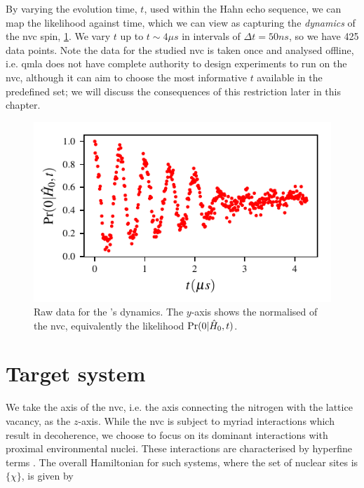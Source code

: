 By varying the evolution time, $t$, used within the Hahn echo sequence, we can map the \gls{likelihood} against time, 
    which we can view as capturing the \emph{dynamics} of the \gls{nvc} spin, \cref{fig:nv_raw_data}.
We vary $t$ up to $t \sim 4 \mu s$ in intervals of $\Delta t = 50 ns$, 
    so we have 425 data points. 
Note the data for the studied \gls{nvc} is taken once and analysed offline, 
    i.e. \gls{qmla} does not have complete authority to design experiments 
    to run on the \gls{nvc}, although it can aim to choose the most informative $t$ 
    available in the predefined set; we will discuss the consequences of this restriction 
    later in this chapter. 

\begin{figure}[t]
    \begin{center}
        \includegraphics{experimental_study/figures/raw_data.pdf}
    \end{center}
    \caption[Raw data for 's dynamics]{
        Raw data for the 's dynamics.
        The $y$-axis shows the normalised  of the \gls{nvc}, 
        equivalently the \gls{likelihood} $\Pr(0 | \hat{H}_0, t)$. 
    }
    \label{fig:nv_raw_data}
\end{figure}



\section{Target system}\label{sec:target_system}
We take the axis of the \gls{nvc}, i.e. the axis connecting the \gls{nitrogen} with the 
    lattice vacancy, as the $z$-axis.
While the \gls{nvc} is subject to myriad interactions which result in decoherence,
    we choose to focus on its dominant interactions with proximal environmental nuclei. 
These interactions are characterised by hyperfine terms \cite{smeltzer201113c}.
The overall Hamiltonian for such systems, where the set of nuclear sites is $\{\chi\}$,
    is given by 

